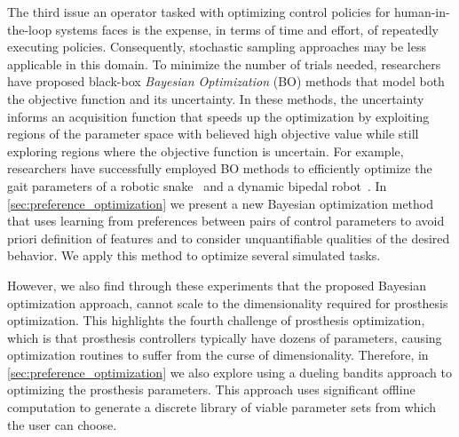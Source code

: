 The third issue an operator tasked with optimizing control policies for
human-in-the-loop systems faces is the expense, in terms of time and effort, of
repeatedly executing policies. Consequently, stochastic sampling approaches may
be less applicable in this domain. To minimize the number of trials needed,
researchers have proposed black-box \emph{Bayesian Optimization} (BO) methods
that model both the objective function and its uncertainty. In these methods,
the uncertainty informs an acquisition function that speeds up the optimization
by exploiting regions of the parameter space with believed high objective value
while still exploring regions where the objective function is uncertain. For
example, researchers have successfully employed BO methods to efficiently
optimize the gait parameters of a robotic snake~\citep{tesch2011using} and a
dynamic bipedal robot~\citep{calandra2014bayesian}. In
\cref{sec:preference_optimization} we present a new Bayesian optimization method
that uses learning from preferences between pairs of control parameters to avoid
priori definition of features and to consider unquantifiable qualities of the
desired behavior. We apply this method to optimize several simulated tasks.

However, we also find through these experiments that the proposed Bayesian
optimization approach, cannot scale to the dimensionality required for
prosthesis optimization. This highlights the fourth challenge of prosthesis
optimization, which is that prosthesis controllers typically have dozens of
parameters, causing optimization routines to suffer from the curse of
dimensionality. Therefore, in \cref{sec:preference_optimization} we also explore
using a dueling bandits \citep{yue2012k} approach to optimizing the prosthesis
parameters. This approach uses significant offline computation to generate a
discrete library of viable parameter sets from which the user can choose.
